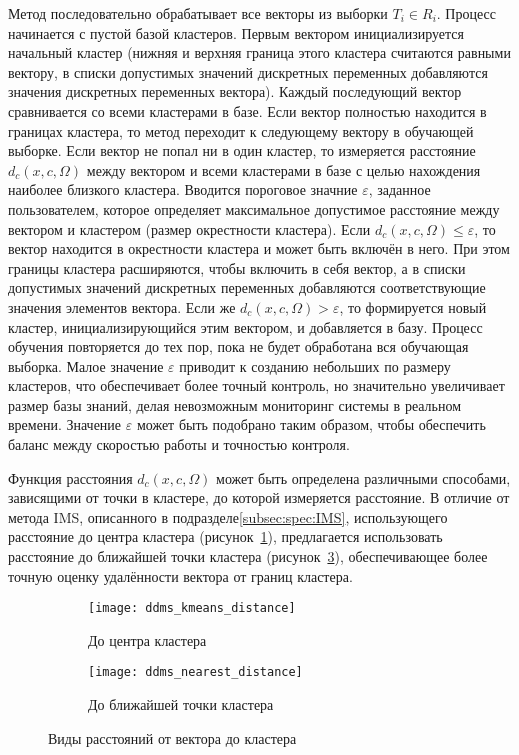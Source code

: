 Метод последовательно обрабатывает все векторы из выборки $T_i\in R_i$. Процесс начинается с пустой базой кластеров. Первым вектором инициализируется начальный кластер (нижняя и верхняя граница этого кластера считаются равными вектору, в списки допустимых значений дискретных переменных добавляются значения дискретных переменных вектора). Каждый последующий вектор сравнивается со всеми кластерами в базе. Если вектор полностью находится в границах кластера, то метод переходит к следующему вектору в обучающей выборке. Если вектор не попал ни в один кластер, то измеряется расстояние $d_c(x,c,\Omega)$ между вектором и всеми кластерами в базе с целью нахождения наиболее близкого кластера. Вводится пороговое значние $\varepsilon$, заданное пользователем, которое определяет максимальное допустимое расстояние между вектором и кластером (размер окрестности кластера). Если $d_c(x,c,\Omega) \leq \varepsilon$, то вектор находится в окрестности кластера и может быть включён в него. При этом границы кластера расширяются, чтобы включить в себя вектор, а в списки допустимых значений дискретных переменных добавляются соответствующие значения элементов вектора. Если же $d_c(x,c,\Omega) > \varepsilon$, то формируется новый кластер, инициализирующийся этим вектором, и добавляется в базу. Процесс обучения повторяется до тех пор, пока не будет обработана вся обучающая выборка. Малое значение $\varepsilon$ приводит к созданию небольших по размеру кластеров, что обеспечивает более точный контроль, но значительно увеличивает размер базы знаний, делая невозможным мониторинг системы в реальном времени. Значение $\varepsilon$ может быть подобрано таким образом, чтобы обеспечить баланс между скоростью работы и точностью контроля.

Функция расстояния $d_c(x,c,\Omega)$ может быть определена различными способами, зависящими от точки в кластере, до которой измеряется расстояние. В отличие от метода IMS, описанного в подразделе\ref{subsec:spec:IMS}, использующего расстояние до центра кластера (рисунок~\ref{fig:spec:DDMS:KMeansDistance}), предлагается использовать расстояние до ближайшей точки кластера (рисунок~\ref{fig:spec:DDMS:NearestDistance}), обеспечивающее более точную оценку удалённости вектора от границ кластера.

\begin{figure}[h]
	\begin{subfigure}[b]{0.35\textwidth}
		\texttt{[image: ddms\_kmeans\_distance]}
		\caption{До центра кластера}
		\label{fig:spec:DDMS:KMeansDistance}
	\end{subfigure}
	\hspace{0.5cm}
	\begin{subfigure}[b]{0.35\textwidth}
		\texttt{[image: ddms\_nearest\_distance]}
		\caption{До ближайшей точки кластера}
		\label{fig:spec:DDMS:NearestDistance}
	\end{subfigure}
	\caption{Виды расстояний от вектора до кластера}
\end{figure}

